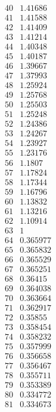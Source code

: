 \documentclass[12pt]{article}
\begin{document}
{$$\begin{array}{|r|r|}
\hline
40 & 1.41686\\
\hline
41 & 1.41588\\
\hline
42 & 1.41409\\
\hline
43 & 1.41214\\
\hline
44 & 1.40348\\
\hline
45 & 1.40187\\
\hline
46 & 1.39667\\
\hline
47 & 1.37993\\
\hline
48 & 1.25924\\
\hline
49 & 1.25768\\
\hline
50 & 1.25503\\
\hline
51 & 1.25248\\
\hline
52 & 1.24386\\
\hline
53 & 1.24267\\
\hline
54 & 1.23927\\
\hline
55 & 1.23176\\
\hline
56 & 1.1807\\
\hline
57 & 1.17824\\
\hline
58 & 1.17344\\
\hline
59 & 1.16796\\
\hline
60 & 1.13832\\
\hline
61 & 1.13216\\
\hline
62 & 1.10914\\
\hline
63 & 1\\
\hline
64 & 0.365977\\
\hline
65 & 0.365832\\
\hline
66 & 0.365529\\
\hline
67 & 0.365251\\
\hline
68 & 0.36415\\
\hline
69 & 0.364038\\
\hline
70 & 0.363664\\
\hline
71 & 0.362917\\
\hline
72 & 0.35855\\
\hline
73 & 0.358454\\
\hline
74 & 0.358232\\
\hline
75 & 0.357999\\
\hline
76 & 0.356658\\
\hline
77 & 0.356467\\
\hline
78 & 0.355711\\
\hline
79 & 0.353389\\
\hline
80 & 0.334772\\
\hline
81 & 0.334673\\

\end{array}$$}
\end{document}
